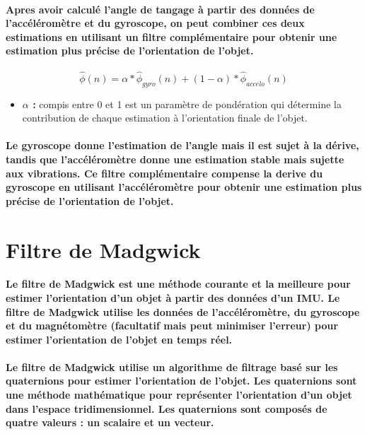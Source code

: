 \paragraph{Apres avoir calculé l'angle de tangage à partir des données de l'accéléromètre et du gyroscope, on peut combiner ces deux estimations en utilisant un filtre complémentaire pour obtenir une estimation plus précise de l'orientation de l'objet.}

\begin{equation}
	\hat{\phi}(n) = \alpha * \hat{\phi}_{gyro}(n) + (1 - \alpha) * \hat{\phi}_{accelo}(n)
\end{equation}

\begin{itemize}
	\item \textbf{$\alpha$ :} compis entre 0 et 1 est un paramètre de pondération qui détermine la contribution de chaque estimation à l'orientation finale de l'objet.
\end{itemize}


\paragraph{
	Le gyroscope donne l'estimation de l'angle mais il est sujet à la dérive, tandis que l'accéléromètre donne une estimation stable mais sujette aux vibrations. Ce filtre complémentaire compense la derive du gyroscope en utilisant l'accéléromètre pour obtenir une estimation plus précise de l'orientation de l'objet.
}

\section{Filtre de Madgwick}

\paragraph{Le filtre de Madgwick est une méthode courante et la meilleure pour estimer l'orientation d'un objet à partir des données d'un IMU. Le filtre de Madgwick utilise les données de l'accéléromètre, du gyroscope et du magnétomètre (facultatif mais peut minimiser l'erreur) pour estimer l'orientation de l'objet en temps réel.}

\paragraph{Le filtre de Madgwick utilise un algorithme de filtrage basé sur les quaternions pour estimer l'orientation de l'objet. Les quaternions sont une méthode mathématique pour représenter l'orientation d'un objet dans l'espace tridimensionnel. Les quaternions sont composés de quatre valeurs : un scalaire et un vecteur.}

